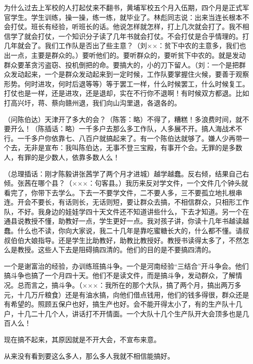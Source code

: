 为什么过去上军校的人打起仗来不翻书，黄埔军校五个月入伍期，四个月是正式军官学生。学生训练，操一操，练一练，就毕业了。林彪同志说：出来当连长根本不会打仗。班长有经验，听班长的话。他说怎样就怎样，打上几次就会打了。我不相信学了就会打仗，一个知识分子读了几年书就会打仗。不会打仗是合乎情理的。打几年就会了。我们工作队是否出了些主意？（刘××：贫下中农的主意多，我们也出一点，主要是群众的。）要听他们的。要听群众的，要听贫下中农的。就是发动群众要革贪污盗窃、投机倒把的命。要搞大的，小的刀下留人。（刘：一个是把群众发动起来，一个是群众发动起来到一定时候，工作队要掌握住火候，要善于观察形势。何时进攻，何时后退等等）等于罢工一样，什么时候罢工，什么时候复工。打仗也是一样，还是进攻，还是退却，实在不行你不退啊！有时候双方都退。比如打高兴圩，蒋、蔡向赣州退，我们向山沟里退，各退各的。

（问陈伯达）天津开了多大的会？（陈答：略）不得了，糟糕！多浪费时间，就不要开么！（陈插话：略）一千多户去那么多工作队，人多展不开。搞人海战术不行。一千多户你依靠七、八百户就搞起来了。有一个陈伯达就够了。嫌人少再带一个去，无非是宣布：我叫陈伯达，无事不登三宝殿，有事开个会。无罪的是多数人，有罪的是少数人，依靠多数人么！

（总理插话：刚才陈毅讲张茜学了两个月才进城）越学越蠢。反右倾，结果自己右倾。张茜在哪个县？（×××：句客县。）我历来反对学文件，一个文件几个钟头就看完了，你带下去学么。下去一不要学文件，二不要人多，三不要孤立地扎根串连。开会不要长，有话则长，无话则短，要让群众去搞，不相信群众，只相形工作队，不好。我身边的娃娃学四十天文件还不知道讲些什么，下去才知道。另一个在通县说教授不懂，助教好一点，学生更好一点。我对孩子讲，你读十几年书越读越蠢。什么也不读，你向大家说，我二十几年是靠吃蜜糖长大的，什么都不懂。请叔叔伯伯大娘指导。还是学生比助教好，助教比教授好。教授书读得太多了，不然怎么是教授。这些人下去是阻碍搞四清的。他们的目的是不要搞四清的。

一个是谢富治的经验，办训练班搞斗争。一个是河南经验“三结合”开斗争会。他们搞斗争也搞了一个月四十天。他们不是读文件，而是搞斗争，发动群众，了解情况。总而言之，搞斗争。（×××：我所在的那个大队，搞了两个月，搞出两万多元，十几万斤粮食）还是有油水搞，向他们借点钱用，他们的钱多得很，群众还是有希望的。照顾五保户也好，搞生产也好。会不能开得太小了，有的生产队十几户，十几二十几个人，讲话打不开情面。一个大队十几个生产队开大会顶多也是几百人么！

现在搞不起来，其原因就是不开大会，不宣布来意。

从来没有看到要这么多人，那么多人我就不相信能搞好。

